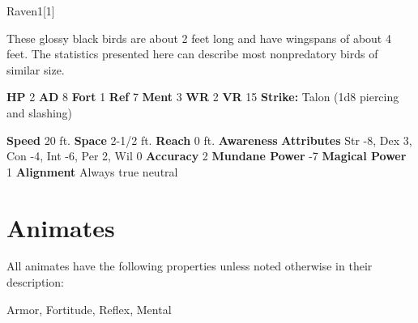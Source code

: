   
  \begin{monsection}{Raven}{1}[1]
    \vspace{-1em}\vspace{-1em}
    \vspace{0em}

    
      These glossy black birds are about 2 feet long and have wingspans of about 4 feet.
      The statistics presented here can describe most nonpredatory birds of similar size.
    
    

    \begin{spellcontent}
      \begin{spelltargetinginfo}
        \pari \textbf{HP} 2 \monsep
          \textbf{AD} 8 \monsep
          \textbf{Fort} 1 \monsep
          \textbf{Ref} 7 \monsep
          \textbf{Ment} 3
        \pari \textbf{WR} 2 \monsep
        \textbf{VR} 15
        \pari \textbf{Strike:}
            Talon  (1d8 piercing and slashing)
      \end{spelltargetinginfo}
    \end{spellcontent}
    \begin{monsterfooter}
      \pari \textbf{Speed} 20 ft. \monsep
        \textbf{Space} 2-1/2 ft. \monsep
        \textbf{Reach} 0 ft.
      \pari \textbf{Awareness} 
      \pari \textbf{Attributes}
        Str -8, Dex 3,
        Con -4, Int -6,
        Per 2, Wil 0
      \pari \textbf{Accuracy} 2 \monsep
        \textbf{Mundane Power} -7 \monsep
      \textbf{Magical Power} 1
      \pari \textbf{Alignment} Always true neutral
    \end{monsterfooter}
  \end{monsection}
  
  
        \section{Animates}

        All animates have the following properties unless noted otherwise in their description:
        
    
     Armor,
     Fortitude,
     Reflex,
     Mental
  
  
      
